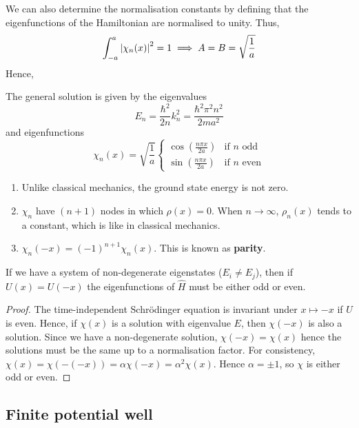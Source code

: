 \documentclass[a4paper,11pt]{article}
\begin{document}
We can also determine the normalisation constants by defining that the eigenfunctions of the Hamiltonian are normalised to unity.
Thus,
\[
	\int_{-a}^a \abs{\chi_n(x)}^2 = 1 \implies A = B = \sqrt{\frac{1}{a}}
\]
Hence, 
\begin{proposition}
    The general solution is given by the eigenvalues
    \[
        E_n = \frac{\hbar^2}{2n} k_n^2 = \frac{\hbar^2 \pi^2 n^2}{2ma^2}
    \]
    and eigenfunctions
    \[
        \chi_n(x) = \sqrt{\frac{1}{a}} \begin{cases}
            \cos(\frac{n \pi x}{2a}) & \text{if } n \text{ odd}  \\
            \sin(\frac{n \pi x}{2a}) & \text{if } n \text{ even}
        \end{cases}
    \]
\end{proposition}
\begin{remark}
	\begin{enumerate}
        \item Unlike classical mechanics, the ground state energy is not zero.
        \item\( \chi_n \) have \( (n+1) \) nodes in which \( \rho(x) = 0 \).
        When \( n \to \infty \), \( \rho_n(x) \) tends to a constant, which is like in classical mechanics.
        \item $\chi_n(-x)=(-1)^{n+1} \chi_n(x) .$
            This is known as \textbf{parity}.
    \end{enumerate}
\end{remark}
\begin{proposition}
	If we have a system of non-degenerate eigenstates (\( E_i \neq E_j \)),  then if \( U(x) = U(-x) \) the eigenfunctions of \( \hat H \) must be either odd or even.
\end{proposition}
\begin{proof}
	The time-independent Schr\"odinger equation is invariant under \( x \mapsto -x \) if \( U \) is even.
	Hence, if \( \chi(x) \) is a solution with eigenvalue \( E \), then \( \chi(-x) \) is also a solution.
	Since we have a non-degenerate solution, \( \chi(-x) = \chi(x) \) hence the solutions must be the same up to a normalisation factor.
	For consistency, \( \chi(x) = \chi(-(-x)) = \alpha \chi(-x) = \alpha^2 \chi(x) \).
	Hence \( \alpha = \pm 1 \), so \( \chi \) is either odd or even.
\end{proof}

\subsection{Finite potential well}
\end{document}
